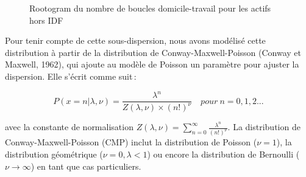 \documentclass[
  9pt,
  a4paper,
  DIV=11]{scrreprt}
\begin{document}
\begin{figure}[htb]

\caption{\label{fig-distrib-bcl}Rootogram du nombre de boucles
domicile-travail pour les actifs hors IDF}


\end{figure}%

Pour tenir compte de cette sous-dispersion, nous avons modélisé cette
distribution à partir de la distribution de Conway-Maxwell-Poisson
(Conway et Maxwell, 1962), qui ajoute au modèle de Poisson un paramètre
pour ajuster la dispersion. Elle s'écrit comme suit\,:

\[
P(x=n|\lambda,\nu) = \frac{\lambda^n}{Z(\lambda, \nu) \times (n!)^\nu} \quad pour\ n=0,1,2...
\]

avec la constante de normalisation
\(Z(\lambda, \nu) = \sum_{n=0}^\infty \frac{\lambda^n}{(n!)^\nu}\). La
distribution de Conway-Maxwell-Poisson (CMP) inclut la distribution de
Poisson (\(\nu=1\)), la distribution géométrique (\(\nu=0, \lambda<1\))
ou encore la distribution de Bernoulli (\(\nu \xrightarrow[]{}\infty\))
en tant que cas particuliers.
\end{document}
